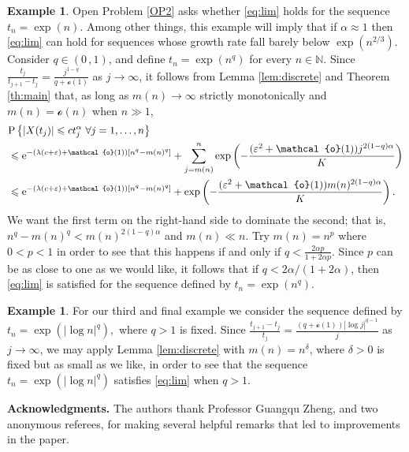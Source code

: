 \documentclass[reqno]{amsart}
\newcommand{\<}{\langle}
\renewcommand{\>}{\rangle}
\newcommand{\N}{\mathbb{N}}
\renewcommand{\P}{\mathrm{P}}
\newcommand{\1}{\mathbb{1}}
\newcommand{\e}{{\rm e}}
\renewcommand{\le}{\leqslant}
\theoremstyle{definition}
\newtheorem{example}[stat]{Example}
\numberwithin{equation}{section}
\begin{document}
\begin{example}
	Open Problem \ref{OP2} asks whether \eqref{eq:lim} holds
	for the sequence $t_n=\exp(n)$. Among other things, 
	this example will imply that
	if $\alpha\approx1$ then \eqref{eq:lim} can hold for 
	sequences whose growth rate fall barely below $\exp(n^{2/3})$.
	Consider $q\in(0\,,1)$, and define
	$t_n = \exp ( n^q)$ for every $n\in\N$. Since
	$\frac{t_j}{t_{j+1}-t_j} =\frac{j^{1-q}}{q +\mathcal{o}(1)}$
	as $j\to\infty$,
	it follows from Lemma \ref{lem:discrete}
	and Theorem \ref{th:main} that, as long as $m(n)\to\infty$ strictly monotonically
	and $m(n)=\mathcal{o}(n)$ when $n\gg1$,
	\begin{align*}
		&\P\left\{ |X(t_j)|\le  ct_j^\alpha\ \forall j=1,\ldots,n\right\}\\
		&\le \e^{-(\lambda(c+\varepsilon) + \mathcal{o}(1))
			\left[n^q-m(n)^q\right]}
			+ \sum_{j=m(n)}^n \exp\left(-
			\frac{(\varepsilon^2+\mathcal{o}(1))j^{2(1-q)\alpha}}{K} \right)\\
		&\le \e^{-(\lambda(c+\varepsilon) + \mathcal{o}(1))
			\left[n^q-m(n)^q\right]}
			+ \exp\left(-
			\frac{(\varepsilon^2+\mathcal{o}(1))m(n)^{2(1-q)\alpha}}{K} \right).
	\end{align*}
	We want the first term on the right-hand side to dominate the second; that is,
	$n^q-m(n)^q < m(n)^{2(1-q)\alpha}$ and $m(n)\ll n.$
	Try $m(n)=n^p$ where $0<p<1$ in order to see that this happens if and only if
	$q < \frac{2\alpha p}{1+2\alpha p}.$
	Since $p$ can be as close to one as we would like,
	it follows that if $q < 2\alpha/(1+2\alpha)$, then \eqref{eq:lim}
	is satisfied for the sequence defined by $t_n=\exp(n^q)$.
\end{example}

\begin{example}
	For our third and final example we consider the sequence defined by
	$t_n = \exp( |\log n|^q),$
	where $q>1$ is fixed. Since
	$\frac{t_{j+1}-t_j}{t_j} = \frac{(q+\mathcal{o}(1))|\log j|^{q-1}}{j}$
	as $j\to\infty$,
	we may apply Lemma \ref{lem:discrete} with $m(n)=n^\delta$, where $\delta>0$
	is fixed but as small as we like, in order to see that the sequence $t_n=\exp( |\log n|^q)$
	satisfies \eqref{eq:lim} when $q>1$.
\end{example}

\bigskip

\noindent
{\bf Acknowledgments.} 
The authors thank Professor Guangqu Zheng, and two anonymous
referees, for making several helpful 
remarks that led to improvements in the paper.




\end{document}

